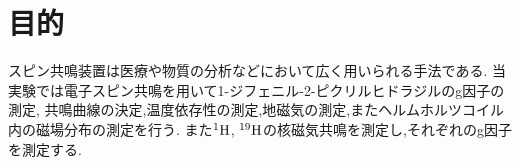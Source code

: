 \documentclass[uplatex,a4j,11pt,dvipdfmx]{jsarticle}
\begin{document}
\section{目的}
スピン共鳴装置は医療や物質の分析などにおいて広く用いられる手法である.
当実験では電子スピン共鳴を用いて1-ジフェニル-2-ピクリルヒドラジルのg因子の測定,
共鳴曲線の決定,温度依存性の測定,地磁気の測定,またヘルムホルツコイル内の磁場分布の測定を行う.
また$^{1}{\rm H}$, $^{19}{\rm H}$の核磁気共鳴を測定し,それぞれのg因子を測定する.





\end{document}
